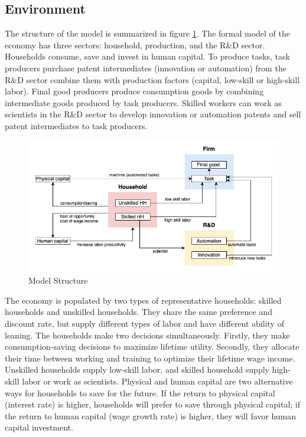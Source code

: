 \documentclass[12pt]{article}
\begin{document}
\subsection{Environment}
The structure of the model is summarized in figure \ref{model}. The formal model of the economy has three sectors: household, production, and the R\&D sector. Households consume, save and invest in human capital. To produce tasks, task producers purchase patent intermediates (innovation or automation) from the R\&D sector combine them with production factors (capital, low-skill or high-skill labor). Final good producers produce consumption goods by combining intermediate goods produced by task producers. Skilled workers can work as scientists in the R\&D sector to develop innovation or automation patents and sell patent intermediates to task producers. 

\begin{figure}[h!]
\caption{Model Structure}
\label{model}
\includegraphics[width = \textwidth]{Model}
\end{figure}

The economy is populated by two types of representative households: skilled households and unskilled households. They share the same preference and discount rate, but supply different types of labor and have different ability of leaning. The households make two decisions simultaneously. Firstly, they make consumption-saving decisions to maximize lifetime utility. Secondly, they allocate their time between working and training to optimize their lifetime wage income. Unskilled households supply low-skill labor, and skilled household supply high-skill labor or work as scientists. Physical and human capital are two alternative ways for households to save for the future. If the return to physical capital (interest rate) is higher, households will prefer to save through physical capital; if the return to human capital (wage growth rate) is higher, they will favor human capital investment. 
\end{document}
